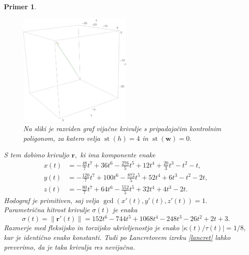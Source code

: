 \documentclass[12pt,a4paper,twoside]{article}
\theoremstyle{definition} %
\theoremstyle{plain} %
\theoremstyle{primerstyle}
\newtheorem{primer}[definicija]{Primer}
\numberwithin{equation}{section}  %
\newcommand{\rV}{\mathbf{r}}
\newcommand{\wV}{\mathbf{w}}
\DeclareMathOperator{\st}{st}
\begin{document}
\begin{primer}
\begin{figure}[h]
	  \includegraphics[width=0.5\textwidth]{images/h4w0_vijacna.pdf}
	  \caption[Primer vijačne krivulje ($\st(h)=4,$ $\st(\wV)=0$)]{Na sliki je razviden graf vijačne krivulje s pripadajočim kontrolnim poligonom, za katero velja $\st(h)=4$ in $\st(\wV)=0.$}
	  \label{fig:h4w0_vijacna}
	\end{figure}
	
	S tem dobimo krivuljo $\rV,$ ki ima komponente enake
	\begin{align*}
		x(t)&=-\frac{48}{7}t^7+36t^6-\frac{276}{5}t^5+12t^4+\frac{20}{3}t^3-t^2-t,\\
		y(t)&=-\frac{120}{7}t^7+100t^6-\frac{872}{5}t^5+52t^4+6t^3-t^2-2t,\\
		z(t)&=-\frac{80}{7}t^7+64t^6-\frac{552}{5}t^5+32t^4+4t^3-2t.
	\end{align*}
	Hodograf je primitiven, saj velja $\gcd(x'(t),y'(t),z'(t))=1.$ Parametrična hitrost krivulje $\sigma(t)$ je enaka
	\begin{equation*}
		\sigma(t)=\lVert\rV'(t)\rVert=152t^6-744t^5+1068t^4-248t^3-26t^2+2t+3.
	\end{equation*}
	Razmerje med fleksijsko in torzijsko ukrivljenostjo je enako $|\kappa(t)/\tau(t)|=1/8,$ kar je identično enako konstanti. Tudi po Lancretovem izreku \ref{lancret} lahko preverimo, da je taka krivulja res nevijačna.
\end{primer}
\end{document}
